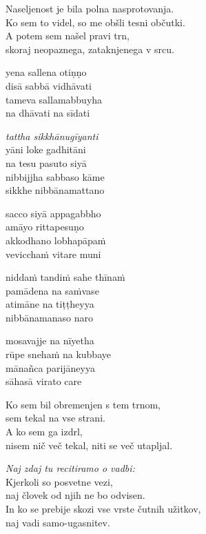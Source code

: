 Naseljenost je bila polna nasprotovanja.\\
Ko sem to videl, so me obšli tesni občutki.\\
A potem sem našel pravi trn,\\
skoraj neopaznega, zataknjenega v srcu.


\clearpage

yena sallena otiṇṇo\\
disā sabbā vidhāvati\\
tameva sallamabbuyha\\
na dhāvati na sīdati

\emph{tattha sikkhānugīyanti}\\
yāni loke gadhitāni\\
na tesu pasuto siyā\\
nibbijjha sabbaso kāme\\
sikkhe nibbānamattano

sacco siyā appagabbho\\
amāyo rittapesuṇo\\
akkodhano lobhapāpaṁ\\
vevicchaṁ vitare muni

niddaṁ tandiṁ sahe thīnaṁ\\
pamādena na saṁvase\\
atimāne na tiṭṭheyya\\
nibbānamanaso naro

mosavajje na nīyetha\\
rūpe snehaṁ na kubbaye\\
mānañca parijāneyya\\
sāhasā virato care


\clearpage

Ko sem bil obremenjen s tem trnom,\\
sem tekal na vse strani.\\
A ko sem ga izdrl,\\
nisem nič več tekal, niti se več utapljal.

\emph{Naj zdaj tu recitiramo o vadbi:}\\
Kjerkoli so posvetne vezi,\\
naj človek od njih ne bo odvisen.\\
In ko se prebije skozi vse vrste čutnih užitkov,\\
naj vadi samo-ugasnitev.

